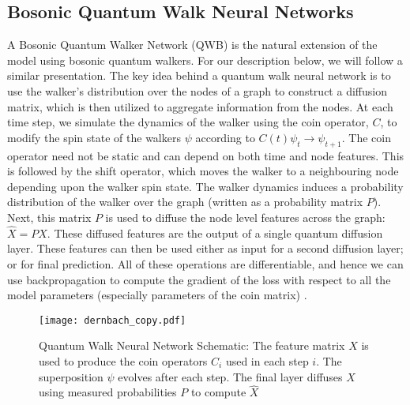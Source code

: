 \documentclass{article}
\begin{document}
\subsection{Bosonic Quantum Walk Neural Networks}
A Bosonic Quantum Walker Network (QWB) is the natural extension of the \citet{Dernbach2018QuantumWI} model using bosonic quantum walkers. For our description below, we will follow a similar presentation.
The key idea behind a quantum walk neural network is to use the  walker's distribution over the nodes of a graph to construct a diffusion matrix, which is then utilized to aggregate information from the nodes.
At each time step,  we simulate the dynamics of the walker using the coin operator, $C$, to modify the spin state of the walkers $\psi$ according to $ C (t) \psi_{t} \xrightarrow{} \psi_{t+1} $. The coin operator need not be static and can depend on both time and node features. This is followed by the shift operator, which moves the walker to a neighbouring node depending upon the walker spin state. The walker dynamics induces a probability distribution of the walker over the graph (written as a probability matrix $P$). 
Next, this matrix $P$ is used to diffuse the node level features across the graph: $\hat{X} = PX$. These diffused features are the output of a single quantum diffusion layer. These features can then be used either as input for a second diffusion layer; or for final prediction. All of these operations are differentiable, and hence we can use backpropagation to compute the gradient of the loss with respect to all the model parameters (especially parameters of the coin matrix) . 




\begin{figure}
    \centering
    \texttt{[image: dernbach\_copy.pdf]}
    \caption{Quantum Walk Neural Network Schematic: The feature matrix $X$ is used to produce the coin operators $C_i$ used in each step $i$. The superposition $\psi$ evolves after each step. The final layer diffuses $X$ using measured probabilities $P$ to compute $\hat{X}$}
    \label{fig:qwnn}
\end{figure}
\end{document}
